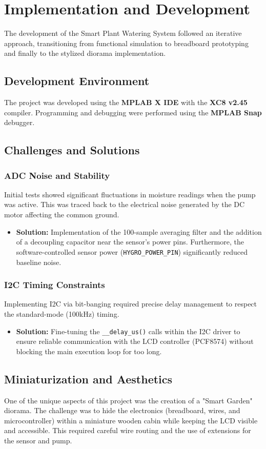 \section{Implementation and Development}
The development of the Smart Plant Watering System followed an iterative approach, transitioning from functional simulation to breadboard prototyping and finally to the stylized diorama implementation.

\subsection{Development Environment}
The project was developed using the \textbf{MPLAB X IDE} with the \textbf{XC8 v2.45} compiler. Programming and debugging were performed using the \textbf{MPLAB Snap} debugger.

\subsection{Challenges and Solutions}
\subsubsection{ADC Noise and Stability}
Initial tests showed significant fluctuations in moisture readings when the pump was active. This was traced back to the electrical noise generated by the DC motor affecting the common ground.
\begin{itemize}
    \item \textbf{Solution:} Implementation of the 100-sample averaging filter and the addition of a decoupling capacitor near the sensor's power pins. Furthermore, the software-controlled sensor power (\texttt{HYGRO\_POWER\_PIN}) significantly reduced baseline noise.
\end{itemize}

\subsubsection{I2C Timing Constraints}
Implementing I2C via bit-banging required precise delay management to respect the standard-mode (100kHz) timing.
\begin{itemize}
    \item \textbf{Solution:} Fine-tuning the \texttt{\_\_delay\_us()} calls within the I2C driver to ensure reliable communication with the LCD controller (PCF8574) without blocking the main execution loop for too long.
\end{itemize}

\subsection{Miniaturization and Aesthetics}
One of the unique aspects of this project was the creation of a "Smart Garden" diorama. The challenge was to hide the electronics (breadboard, wires, and microcontroller) within a miniature wooden cabin while keeping the LCD visible and accessible. This required careful wire routing and the use of extensions for the sensor and pump.
